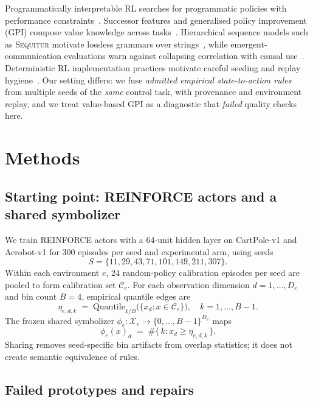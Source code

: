 \documentclass[11pt,a4paper]{article}
\begin{document}
Programmatically interpretable RL searches for programmatic policies with performance constraints~\citep{verma2018pirl}.
Successor features and generalised policy improvement (GPI) compose value knowledge across tasks~\citep{barreto2017sf,thakoor2022gpi}.
Hierarchical sequence models such as \textsc{Sequitur} motivate lossless grammars over strings~\citep{nevill1997sequitur}, while emergent-communication evaluations warn against collapsing correlation with causal use~\citep{lowe2019pitfalls}.
Deterministic RL implementation practices motivate careful seeding and replay hygiene~\citep{nagarajan2018det}.
Our setting differs: we fuse \emph{admitted empirical state-to-action rules} from multiple seeds of the \emph{same} control task, with provenance and environment replay, and we treat value-based GPI as a diagnostic that \emph{failed} quality checks here.

\section{Methods}
\label{sec:methods}

\subsection{Starting point: REINFORCE actors and a shared symbolizer}
\label{sec:symbolizer}

We train REINFORCE actors with a 64-unit hidden layer on CartPole-v1 and Acrobot-v1 for 300 episodes per seed and experimental arm, using seeds
\[
S=\{11,29,43,71,101,149,211,307\}.
\]
Within each environment \(e\), 24 random-policy calibration episodes per seed are pooled to form calibration set \(\mathcal{C}_e\).
For each observation dimension \(d=1,\ldots,D_e\) and bin count \(B=4\), empirical quantile edges are
\begin{equation}
\label{eq:edges}
\eta_{e,d,k}
\;=\;
\mathrm{Quantile}_{k/B}\!\bigl(\{x_d:x\in\mathcal{C}_e\}\bigr),
\quad k=1,\ldots,B-1.
\end{equation}
The frozen shared symbolizer \(\phi_e:\mathcal{X}_e\to\{0,\ldots,B-1\}^{D_e}\) maps
\begin{equation}
\label{eq:phi}
\phi_e(x)_d
\;=\;
\#\{\,k:x_d\ge\eta_{e,d,k}\,\}.
\end{equation}
Sharing removes seed-specific bin artifacts from overlap statistics; it does not create semantic equivalence of rules.

\subsection{Failed prototypes and repairs}
\label{sec:failures}
\end{document}
